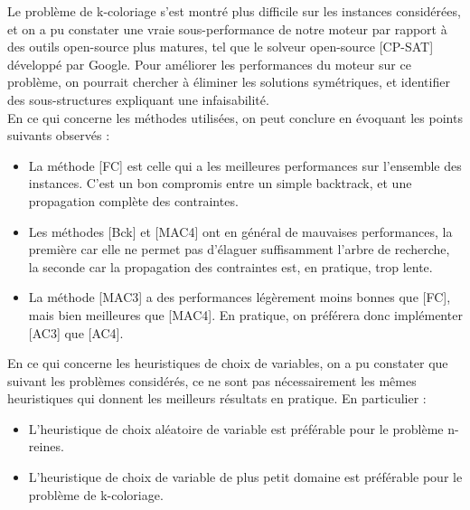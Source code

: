 \documentclass[14pt]{article}
\begin{document}
Le problème de k-coloriage s'est montré plus difficile sur les instances considérées, et on a pu constater une vraie sous-performance de notre moteur par rapport à des outils open-source plus matures, tel que le solveur open-source [CP-SAT] développé par Google. Pour améliorer les performances du moteur sur ce problème, on pourrait chercher à éliminer les solutions symétriques, et identifier des sous-structures expliquant une infaisabilité.\\

En ce qui concerne les méthodes utilisées, on peut conclure en évoquant les points suivants observés :

\begin{itemize}
	\item La méthode [FC] est celle qui a les meilleures performances sur l'ensemble des instances. C'est un bon compromis entre un simple backtrack, et une propagation complète des contraintes.
	\item Les méthodes [Bck] et [MAC4] ont en général de mauvaises performances, la première car elle ne permet pas d'élaguer suffisamment l'arbre de recherche, la seconde car la propagation des contraintes est, en pratique, trop lente.
	\item La méthode [MAC3] a des performances légèrement moins bonnes que [FC], mais bien meilleures que [MAC4]. En pratique, on préférera donc implémenter [AC3] que [AC4].\\
\end{itemize}


En ce qui concerne les heuristiques de choix de variables, on a pu constater que suivant les problèmes considérés, ce ne sont pas nécessairement les mêmes heuristiques qui donnent les meilleurs résultats en pratique. En particulier : 

\begin{itemize}
	\item L'heuristique de choix aléatoire de variable est préférable pour le problème n-reines.
	\item L'heuristique de choix de variable de plus petit domaine est préférable pour le problème de k-coloriage.
\end{itemize}
\end{document}
